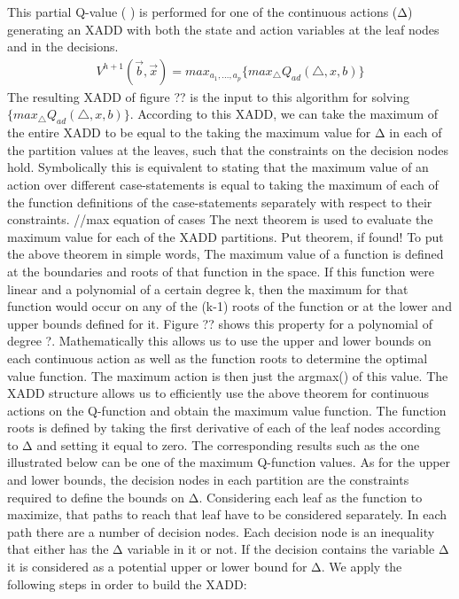 \documentclass[letterpaper]{article}
\renewcommand{\-}{\text{-}}
\begin{document}
This partial Q-value ( ) is performed for one of the continuous actions (Δ) generating an XADD with both the state and action variables at the leaf nodes and in the decisions. 
\begin{align}
V^{h+1}(\overrightarrow{b},\overrightarrow{x})=max_{a_{1},...,a_{p}}\{max_{\bigtriangleup}Q_{ad}(\bigtriangleup,x,b)\}
\end{align}
The resulting XADD of figure ?? is the input to this algorithm for solving  $\{max_{\bigtriangleup}Q_{ad}(\bigtriangleup,x,b)\}$.
According to this XADD, we can take the maximum of the entire XADD to be equal to the taking the maximum value for Δ in each of the partition values at the leaves, such that the constraints on the decision nodes hold. Symbolically this is equivalent to stating that the maximum value of an action over different case-statements is equal to taking the maximum of each of the function definitions of the case-statements separately with respect to their constraints.
//max equation of cases
The next theorem is used to evaluate the maximum value for each of the XADD partitions. 
Put theorem, if found!  
To put the above theorem in simple words, The maximum value of a function is defined at the boundaries and roots of that function in the space. If this function were linear and a polynomial of a certain degree k, then the maximum for that function would occur on any of the (k-1) roots of the function or at the lower and upper bounds defined for it. Figure ?? shows this property for a polynomial of degree ?. Mathematically this allows us to use the upper and lower bounds on each continuous action as well as the function roots to determine the optimal value function. The maximum action is then just the argmax() of this value. 
The XADD structure allows us to efficiently use the above theorem for continuous actions on the Q-function and obtain the maximum value function. The function roots is defined by taking the first derivative of each of the leaf nodes according to Δ and setting it equal to zero. The corresponding results such as the one illustrated below can be one of the maximum Q-function values. 
As for the upper and lower bounds, the decision nodes in each partition are the constraints required to define the bounds on Δ. Considering each leaf as the function to maximize, that paths to reach that leaf have to be considered separately. In each path there are a number of decision nodes. Each decision node is an inequality that either has the Δ variable in it or not. If the decision contains the variable Δ it is considered as a potential upper or lower bound for Δ. We apply the following steps in order to build the XADD: 
\end{document}
